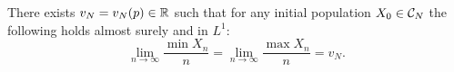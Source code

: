 
\begin{proposition}\label{prop:ExpTailsSpeedExistence}
There exists $v_N = v_N(p) \in \R$ such that for any initial population $X_0 \in \cal{C}_N$ the following holds almost surely and in $L^1$:
\begin{equation}
\lim\limits_{n \to \infty} \frac{\min X_n}{n} = \lim\limits_{n \to \infty} \frac{\max X_n}{n} = v_N. 
\end{equation}
\end{proposition}

